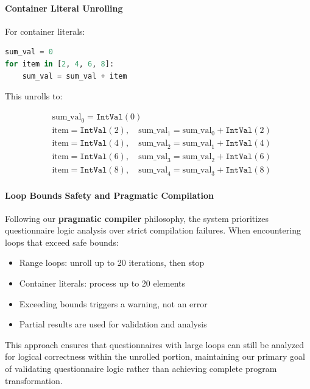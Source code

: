 \paragraph{Container Literal Unrolling}

For container literals:

\begin{lstlisting}[language=Python, numbers=none, caption={Loop over container literal}]
sum_val = 0
for item in [2, 4, 6, 8]:
    sum_val = sum_val + item
\end{lstlisting}

This unrolls to:

\begin{align*}
& \text{sum\_val}_0 = \texttt{IntVal}(0) \\
& \text{item} = \texttt{IntVal}(2), \quad \text{sum\_val}_1 = \text{sum\_val}_0 + \texttt{IntVal}(2) \\
& \text{item} = \texttt{IntVal}(4), \quad \text{sum\_val}_2 = \text{sum\_val}_1 + \texttt{IntVal}(4) \\
& \text{item} = \texttt{IntVal}(6), \quad \text{sum\_val}_3 = \text{sum\_val}_2 + \texttt{IntVal}(6) \\
& \text{item} = \texttt{IntVal}(8), \quad \text{sum\_val}_4 = \text{sum\_val}_3 + \texttt{IntVal}(8)
\end{align*}

\paragraph{Loop Bounds Safety and Pragmatic Compilation}

Following our \textbf{pragmatic compiler} philosophy, the system prioritizes questionnaire logic analysis over strict compilation failures. When encountering loops that exceed safe bounds:

\begin{itemize}
    \item Range loops: unroll up to 20 iterations, then stop
    \item Container literals: process up to 20 elements
    \item Exceeding bounds triggers a warning, not an error
    \item Partial results are used for validation and analysis
\end{itemize}

This approach ensures that questionnaires with large loops can still be analyzed for logical correctness within the unrolled portion, maintaining our primary goal of validating questionnaire logic rather than achieving complete program transformation.

